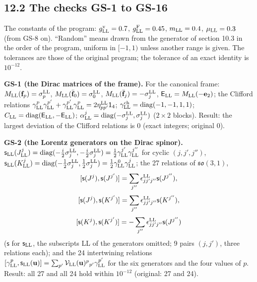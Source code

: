 \documentclass[
  10pt,
]{article}
\begin{document}
\hypertarget{the-checks-gs-1-to-gs-16}{%
\subsection{12.2 The checks GS-1 to
GS-16}\label{the-checks-gs-1-to-gs-16}}

The constants of the program: \(g^{\rm v}_{\rm LL}=0.7\),
\(g^{\rm F}_{\rm LL}=0.45\), \(m_{\rm LL}=0.4\), \(\mu_{\rm LL}=0.3\)
(from GS-8 on). ``Random'' means drawn from the generator of section
10.3 in the order of the program, uniform in \([-1,1)\) unless another
range is given. The tolerances are those of the original program; the
tolerance of an exact identity is \(10^{-12}\).

\textbf{GS-1 (the Dirac matrices of the frame).} For the canonical
frame: \(M_{\rm LL}(\mathbf f_p)=\sigma^{\rm LL}_p\),
\(M_{\rm LL}(\bar{\mathbf f}_0)=\sigma^{\rm LL}_0\),
\(M_{\rm LL}(\bar{\mathbf f}_j)=-\sigma^{\rm LL}_j\),
\(\mathsf E_{\rm LL}=M_{\rm LL}(-\mathbf e_2)\); the Clifford relations
\(\gamma^p_{\rm LL}\gamma^{p'}_{\rm LL}+\gamma^{p'}_{\rm LL}\gamma^p_{\rm LL}=2\eta^{\rm LL}_{pp'}\mathsf 1_4\);
\(\gamma^{\rm ch}_{\rm LL}=\mathrm{diag}(-1,-1,1,1)\);
\(C_{\rm LL}=\mathrm{diag}(\mathsf E_{\rm LL},-\mathsf E_{\rm LL})\);
\(\alpha^j_{\rm LL}=\mathrm{diag}(-\sigma^{\rm LL}_j,\sigma^{\rm LL}_j)\)
(\(2\times2\) blocks). Result: the largest deviation of the Clifford
relations is 0 (exact integers; original 0).

\textbf{GS-2 (the Lorentz generators on the Dirac spinor).}
\(\mathsf s_{\rm LL}(J^j_{\rm LL})=\mathrm{diag}(-\tfrac i2\sigma^{\rm LL}_j,-\tfrac i2\sigma^{\rm LL}_j)=\tfrac12\gamma^{j'}_{\rm LL}\gamma^{j''}_{\rm LL}\)
for cyclic \((j,j',j'')\),
\(\mathsf s_{\rm LL}(K^j_{\rm LL})=\mathrm{diag}(-\tfrac12\sigma^{\rm LL}_j,\tfrac12\sigma^{\rm LL}_j)=\tfrac12\gamma^0_{\rm LL}\gamma^j_{\rm LL}\);
the 27 relations of \(\mathfrak{so}(3,1)\),
\[[\mathsf s(J^j),\mathsf s(J^{j'})]=\sum_{j''}\epsilon^{\rm LL}_{jj'j''}\mathsf s(J^{j''}),\]
\[[\mathsf s(J^j),\mathsf s(K^{j'})]=\sum_{j''}\epsilon^{\rm LL}_{jj'j''}\mathsf s(K^{j''}),\]
\[[\mathsf s(K^j),\mathsf s(K^{j'})]=-\sum_{j''}\epsilon^{\rm LL}_{jj'j''}\mathsf s(J^{j''})\]
(\(\mathsf s\) for \(\mathsf s_{\rm LL}\), the subscripts LL of the
generators omitted; 9 pairs \((j,j')\), three relations each); and the
24 intertwining relations
\([\gamma^p_{\rm LL},\mathsf s_{\rm LL}(\mathbf u)]=\sum_{p'}\mathcal V_{\rm LL}(\mathbf u)^p{}_{p'}\gamma^{p'}_{\rm LL}\)
for the six generators and the four values of \(p\). Result: all 27 and
all 24 hold within \(10^{-12}\) (original: 27 and 24).
\end{document}
